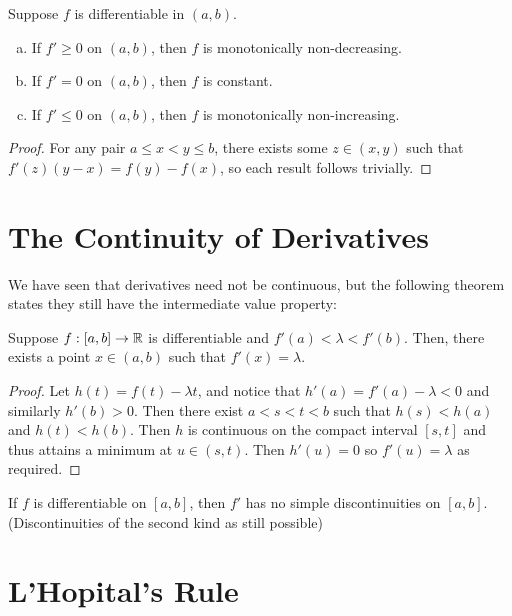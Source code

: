 \begin{theorem} %
    Suppose $f$ is differentiable in $(a, b)$.
    \begin{enumerate}[(a)]
        \item If $f' \ge 0$ on $(a, b)$, then $f$ is monotonically non-decreasing.
        \item If $f' = 0$ on $(a, b)$, then $f$ is constant.
        \item If $f' \le 0$ on $(a, b)$, then $f$ is monotonically non-increasing.
    \end{enumerate}

    \begin{proof}
        For any pair $a \le x < y \le b$, there exists some $z \in (x, y)$ such that $f'(z) (y - x) = f(y) - f(x)$, so each result follows trivially.
    \end{proof}
\end{theorem}

\section{The Continuity of Derivatives}

We have seen that derivatives need not be continuous, but the following theorem states they still have the intermediate value property:

\begin{theorem} %
    Suppose $f: [a, b] \rightarrow \mathbb{R}$ is differentiable and $f'(a) < \lambda < f'(b)$. Then, there exists a point $x \in (a, b)$ such that $f'(x) = \lambda$.
    
    \begin{proof}
        Let $h(t) = f(t) - \lambda t$, and notice that $h'(a) = f'(a) - \lambda < 0$ and similarly $h'(b) > 0$. Then there exist $a < s < t < b$ such that $h(s) < h(a)$ and $h(t) < h(b)$. Then $h$ is continuous on the compact interval $[s, t]$ and thus attains a minimum at $u \in (s, t)$. Then $h'(u) = 0$ so $f'(u) = \lambda$ as required. 
    \end{proof}
\end{theorem}

\begin{corollary} 
    If $f$ is differentiable on $[a, b]$, then $f'$ has no simple discontinuities on $[a, b]$. (Discontinuities of the second kind as still possible)
\end{corollary}

\section{L'Hopital's Rule}

